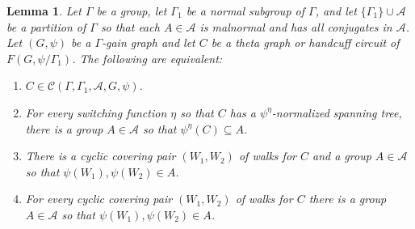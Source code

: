 \documentclass[12pt]{article}
\newtheorem{lemma}[theorem]{Lemma}
\theoremstyle{definition}
\newcommand{\cA}{\mathcal{A}}
\newcommand{\cC}{\mathcal{C}}
\begin{document}
\begin{lemma} \label{lem: equivalences for the linear class}
Let $\Gamma$ be a group, let $\Gamma_1$ be a normal subgroup of $\Gamma$, and let $\{\Gamma_1\} \cup \cA$ be a partition of $\Gamma$ so that each $A \in \cA$ is malnormal and has all conjugates in $\cA$.
Let $(G, \psi)$ be a $\Gamma$-gain graph and let $C$ be a theta graph or handcuff circuit of $F(G, \psi/\Gamma_1)$.
The following are equivalent:
\begin{enumerate}[label=$(\roman*)$]
\item $C \in \cC(\Gamma, \Gamma_1, \cA, G, \psi)$.

\item For every switching function $\eta$ so that $C$ has a $\psi^{\eta}$-normalized spanning tree, there is a group $A \in \cA$ so that $\psi^{\eta}(C) \subseteq A$.

\item There is a cyclic covering pair $(W_1, W_2)$ of walks for $C$ and a group $A \in \cA$ so that $\psi(W_1), \psi(W_2) \in A$.

\item For every cyclic covering pair $(W_1, W_2)$ of walks for $C$ there is a group $A \in \cA$ so that $\psi(W_1), \psi(W_2) \in A$.
\end{enumerate}
\end{lemma}
\end{document}
